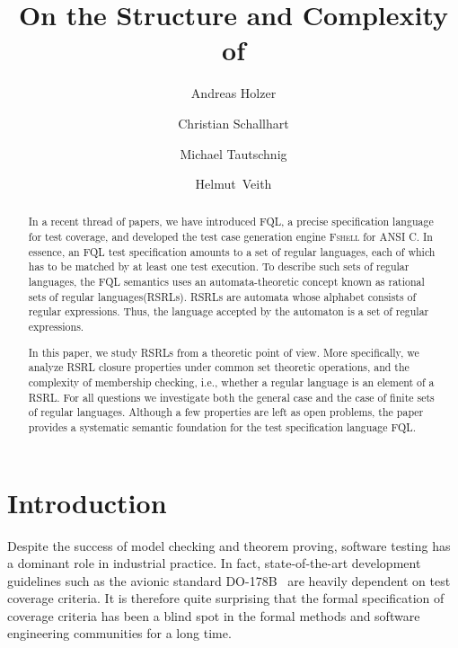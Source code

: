 \documentclass[envcountsame]{llncs}
\title{On the Structure and Complexity of \RegularlyGeneratedLanguageSetsTitle}
\author{Andreas Holzer\inst{1} \and Christian Schallhart\inst{2} \and Michael
  Tautschnig\inst{3} \and Helmut~Veith\inst{1}}
\institute{Vienna University of Technology, Austria \and University of Oxford, UK \and Queen Mary, University of London, UK}
\newcommand{\RegularlyGeneratedLanguageSets}{rational sets of regular languages\xspace}
\newcommand{\RegularlyGeneratedLanguageSetAbbrev}{RSRL\xspace}
\newcommand{\RegularlyGeneratedLanguageSetsAbbrev}{RSRLs\xspace}
\newcommand{\FSHELL}{\textsc{Fshell}\xspace}
\newcommand{\FQL}{FQL\xspace}
\begin{document}
\maketitle

\thispagestyle{plain} 
\pagestyle{plain} 


\begin{abstract}
In a recent thread of papers, we have introduced \FQL, a precise specification
language for test coverage, and developed the test case generation engine \FSHELL
for ANSI C. In essence, an \FQL test specification amounts to a set of regular languages,
each of which has to be matched by at least one test execution. To describe such sets of regular
languages, the \FQL semantics uses an automata-theoretic concept
known as \RegularlyGeneratedLanguageSets (\RegularlyGeneratedLanguageSetsAbbrev). \RegularlyGeneratedLanguageSetsAbbrev are automata whose alphabet
consists of regular expressions. Thus, the language accepted by the automaton is a set of
regular expressions.

In this paper, we study RSRLs from a theoretic point of view. More specifically, we analyze
RSRL closure properties under common set theoretic operations, and the complexity of membership checking,
i.e., whether a regular language is an element of a \RegularlyGeneratedLanguageSetAbbrev. For all questions we investigate both the general
case and the case of finite sets of regular languages. Although a few properties are left as open problems,
the paper provides a systematic semantic foundation for the test specification language \FQL.
\end{abstract}
 \section{Introduction}
\label{sec:introduction}

Despite the success of model checking and theorem proving, software testing has a dominant role
in industrial practice. In fact, state-of-the-art development guidelines such as the avionic
standard DO-178B~\cite{do-178b} are heavily dependent on test coverage criteria. It is therefore quite
surprising that the formal specification of coverage criteria has been a blind spot in the
formal methods and software engineering communities for a long time.
\end{document}
